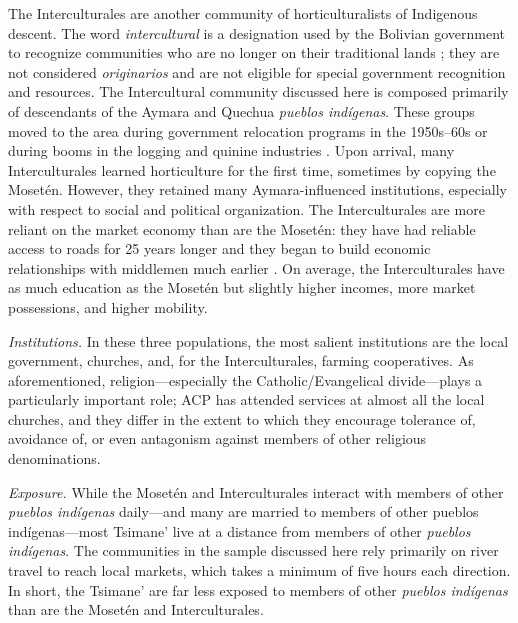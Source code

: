 \documentclass[bibauthoryear]{aa}
\begin{document}
The Interculturales are another community of horticulturalists of Indigenous descent. The word \textit{intercultural} is a designation used by the Bolivian government to recognize communities who are no longer on their traditional lands \citep{albo2007bolivia}; they are not considered \textit{originarios} and are not eligible for special government recognition and resources. The Intercultural community discussed here is composed primarily of descendants of the Aymara and Quechua \textit{pueblos ind\'igenas}. These groups moved to the area during government relocation programs in the 1950s--60s or during booms in the logging and quinine industries  \citep{pisor2016risk, pisor2018diversify}. Upon arrival, many Interculturales learned horticulture for the first time, sometimes by copying the Moset\'en. However, they retained many Aymara-influenced institutions, especially with respect to social and political organization. The Interculturales are more reliant on the market economy than are the Moset\'en: they have had reliable access to roads for 25 years longer \citep{Llojlla2011} and they began to build economic relationships with middlemen much earlier \citep{pisorjones2020}. On average, the Interculturales have as much education as the Moset\'en but slightly higher incomes, more market possessions, and higher mobility.

\emph{Institutions.} In these three populations, the most salient institutions are the local government, churches, and, for the Interculturales, farming cooperatives. As aforementioned, religion---especially the Catholic/Evangelical divide---plays a particularly important role; ACP has attended services at almost all the local churches, and they differ in the extent to which they encourage tolerance of, avoidance of, or even antagonism against members of other religious denominations. %

\emph{Exposure.} While the Moset\'en and Interculturales interact with members of other \textit{pueblos ind\'igenas} daily---and many are married to members of other pueblos ind\'igenas---most Tsimane' live at a distance from members of other \textit{pueblos ind\'igenas}. The communities in the sample discussed here rely primarily on river travel to reach local markets, which takes a minimum of five hours each direction. In short, the Tsimane' are far less exposed to members of other \textit{pueblos ind\'igenas} than are the Moset\'en and Interculturales. %
\end{document}
